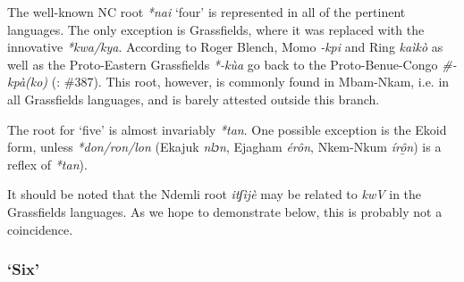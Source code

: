 The well-known NC root \textit{*nai} `four' is represented in all of the pertinent languages. The only exception is Grassfields, where it was replaced with the innovative \textit{*kwa/kya}. According to Roger Blench, Momo \textit{-kpi} and Ring \textit{kaìkò} as well as the Proto-Eastern Grassfields \textit{*-k{\`{u}}a} go back to the Proto-Benue-Congo \textit{\#-kpà(ko)} (\citealt{Blench2004}: \#387). This root, however, is commonly found in Mbam-Nkam, i.e. in all Grassfields languages, and is barely attested outside this branch.

The root for `five' is almost invariably \textit{*tan}. One possible exception is the Ekoid form, unless \textit{*don/ron/lon} (Ekajuk \textit{nlɔn}, Ejagham \textit{ér{\^{o}}n}, Nkem-Nkum \textit{íro{\^{̱}}n}) is a reflex of \textit{*tan}).

It should be noted that the Ndemli root \textit{itʃìjè} may be related to \textit{kwV} in the Grassfields languages. As we hope to demonstrate below, this is probably not a coincidence. 

 
\subsubsection{`Six'}\label{sec:3.1.1.4}

